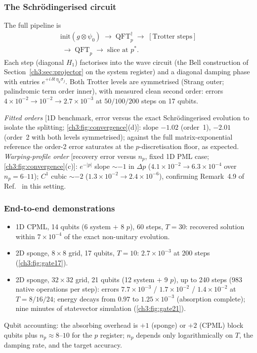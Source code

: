 \subsubsection{The Schr\"odingerised circuit}
\label{ch3:sec:circuit}

The full pipeline is
\begin{equation}
\begin{split}
  \mathrm{init}(g\otimes\psi_0)
  \;\to\; \mathrm{QFT}^{\dagger}_p
  \;\to\; [\text{Trotter steps}] \\
  \;\to\; \mathrm{QFT}_p
  \;\to\; \text{slice at } p^{*}.
\end{split}
  \label{ch3:eq:pipeline}
\end{equation}
Each step (diagonal $H_1$) factorises into the wave circuit (the Bell
construction of Section~\ref{ch3:sec:projector} on the system register) and a
diagonal damping phase with entries $e^{+i\,\delta t\,\eta_k\sigma_j}$.
Both Trotter levels are symmetrised (Strang outer; palindromic term order
inner), with measured clean second order: errors
$4\times10^{-2}\to10^{-2}\to2.7\times10^{-3}$ at $50/100/200$ steps on 17
qubits.

\emph{Fitted orders} [1D benchmark, error versus the exact
Schr\"odingerised evolution to isolate the splitting;
\ref{ch3:fig:convergence}(d)]: slope $-1.02$ (order~1), $-2.01$ (order~2
with both levels symmetrised); against the full matrix-exponential
reference the order-2 error saturates at the $p$-discretisation floor, as
expected.  \emph{Warping-profile order} [recovery error versus $n_p$,
fixed 1D PML case; \ref{ch3:fig:convergence}(c)]: $e^{-|p|}$ slope
${\sim}{-1}$ in $\Delta p$ ($4.1\times10^{-2}\to6.3\times10^{-4}$ over
$n_p=6$--$11$); $C^{1}$ cubic ${\sim}{-2}$
($1.3\times10^{-2}\to2.4\times10^{-6}$), confirming Remark~4.9 of
Ref.~\cite{jin2024recovery} in this setting.

\subsubsection{End-to-end demonstrations}
\label{ch3:sec:demos}

\begin{itemize}
\item 1D CPML, 14 qubits (6 system $+$ 8 $p$), 60 steps, $T=30$:
  recovered solution within $7\times10^{-4}$ of the exact non-unitary
  evolution.
\item 2D sponge, $8\times8$ grid, 17 qubits, $T=10$:
  $2.7\times10^{-3}$ at 200 steps (\ref{ch3:fig:gate17}).
\item 2D sponge, $32\times32$ grid, 21 qubits (12 system $+$ 9 $p$), up
  to 240 steps (983 native operations per step): errors
  $7.7\times10^{-3}$ / $1.7\times10^{-2}$ / $1.4\times10^{-2}$ at
  $T=8/16/24$; energy decays from $0.97$ to $1.25\times10^{-3}$
  (absorption complete); nine minutes of statevector simulation
  (\ref{ch3:fig:gate21}).
\end{itemize}
Qubit accounting: the absorbing overhead is $+1$ (sponge) or $+2$ (CPML)
block qubits plus $n_p\approx8$--$10$ for the $p$ register; $n_p$ depends
only logarithmically on $T$, the damping rate, and the target accuracy.

